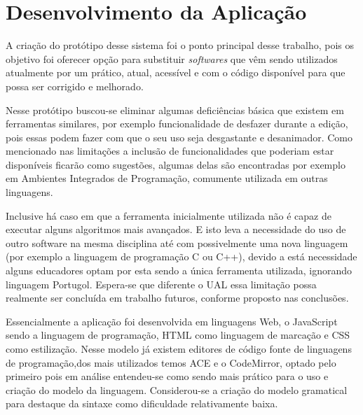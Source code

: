 
\ifdraft{\color{green}}{}\chapter{Desenvolvimento da Aplicação}

A criação do protótipo desse sistema foi o ponto principal desse trabalho, pois os objetivo foi oferecer opção para substituir \textit{softwares} que vêm sendo utilizados atualmente por um prático, atual, acessível e com o código disponível para que possa ser corrigido e melhorado.

Nesse protótipo buscou-se eliminar algumas deficiências básica que existem em ferramentas similares, por exemplo funcionalidade de desfazer durante a edição, pois essas podem fazer com que o seu uso seja desgastante e desanimador. Como mencionado nas limitações a inclusão de funcionalidades que poderiam estar disponíveis ficarão como sugestões, algumas delas são encontradas por exemplo em Ambientes Integrados de Programação, comumente utilizada em outras linguagens.

Inclusive há caso em que a ferramenta inicialmente utilizada não é capaz de executar alguns algoritmos mais avançados. E isto leva a necessidade do uso de outro software na mesma disciplina até com possivelmente uma nova linguagem (por exemplo a linguagem de programação C ou C++), devido a está necessidade alguns educadores optam por esta sendo a única ferramenta utilizada, ignorando linguagem Portugol. Espera-se que diferente o UAL essa limitação possa realmente ser concluída em trabalho futuros, conforme proposto nas conclusões.

Essencialmente a aplicação foi desenvolvida em linguagens Web, o JavaScript sendo a linguagem de programação, HTML como linguagem de marcação e CSS como estilização. Nesse modelo já existem editores de código fonte de linguagens de programação,dos mais utilizados temos ACE\nocite{ace} e o CodeMirror\nocite{codemirror}, optado pelo primeiro pois em análise entendeu-se como sendo mais prático para o uso e criação do modelo da linguagem. Considerou-se a criação do modelo gramatical para destaque da sintaxe como dificuldade relativamente baixa.


